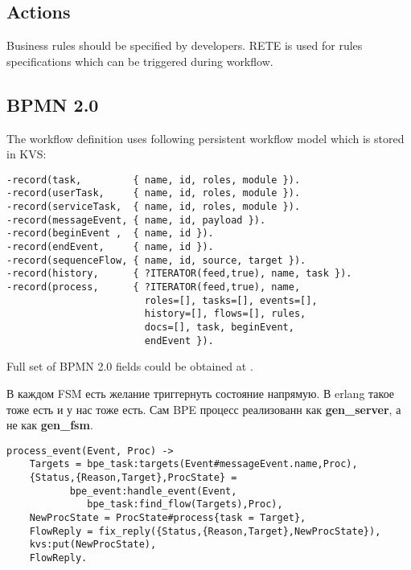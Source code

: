 \subsection{Actions}
Business rules should be specified by developers.
RETE is used for rules specifications which can be triggered during workflow.

\newpage

\subsection{BPMN 2.0}

The workflow definition uses following persistent workflow model which is stored in KVS:


\vspace{1\baselineskip}
\begin{lstlisting}
-record(task,         { name, id, roles, module }).
-record(userTask,     { name, id, roles, module }).
-record(serviceTask,  { name, id, roles, module }).
-record(messageEvent, { name, id, payload }).
-record(beginEvent ,  { name, id }).
-record(endEvent,     { name, id }).
-record(sequenceFlow, { name, id, source, target }).
-record(history,      { ?ITERATOR(feed,true), name, task }).
-record(process,      { ?ITERATOR(feed,true), name,
                        roles=[], tasks=[], events=[],
                        history=[], flows=[], rules,
                        docs=[], task, beginEvent,
                        endEvent }).
\end{lstlisting}

Full set of BPMN 2.0 fields could be obtained at .

\newpage

В каждом FSM есть желание триггернуть состояние напрямую.
В erlang такое тоже есть и у нас тоже есть. Сам BPE процесс
реализованн как {\bf gen\_server}, а не как {\bf gen\_fsm}.

\vspace{1\baselineskip}
\begin{lstlisting}[caption=Boundary Event]
process_event(Event, Proc) ->
    Targets = bpe_task:targets(Event#messageEvent.name,Proc),
    {Status,{Reason,Target},ProcState} =
           bpe_event:handle_event(Event,
              bpe_task:find_flow(Targets),Proc),
    NewProcState = ProcState#process{task = Target},
    FlowReply = fix_reply({Status,{Reason,Target},NewProcState}),
    kvs:put(NewProcState),
    FlowReply.
\end{lstlisting}

